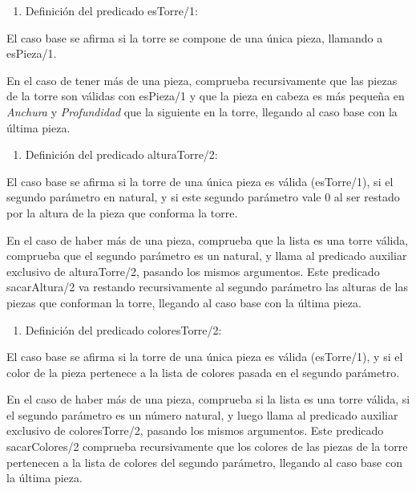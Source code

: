 \documentclass{article} %
\begin{document}
\noindent 

\begin{enumerate}
\item  Definición del predicado esTorre/1:
\end{enumerate}

\noindent El caso base se afirma si la torre se compone de una única pieza, llamando a esPieza/1.

\noindent En el caso de tener más de una pieza, comprueba recursivamente que las piezas de la torre son válidas con esPieza/1 y que la pieza en cabeza es más pequeña en \textit{Anchura} y \textit{Profundidad} que la siguiente en la torre, llegando al caso base con la última pieza.

\noindent 

\begin{enumerate}
\item  Definición del predicado alturaTorre/2:
\end{enumerate}

\noindent El caso base se afirma si la torre de una única pieza es válida (esTorre/1), si el segundo parámetro en natural, y si este segundo parámetro vale 0 al ser restado por la altura de la pieza que conforma la torre.

\noindent En el caso de haber más de una pieza, comprueba que la lista es una torre válida, comprueba que el segundo parámetro es un natural, y llama al predicado auxiliar exclusivo de alturaTorre/2, pasando los mismos argumentos. Este predicado sacarAltura/2 va restando recursivamente al segundo parámetro las alturas de las piezas que conforman la torre, llegando al caso base con la última pieza.

\noindent 

\begin{enumerate}
\item  Definición del predicado coloresTorre/2:
\end{enumerate}

\noindent El caso base se afirma si la torre de una única pieza es válida (esTorre/1), y si el color de la pieza pertenece a la lista de colores pasada en el segundo parámetro.

\noindent En el caso de haber más de una pieza, comprueba si la lista es una torre válida, si el segundo parámetro es un número natural, y luego llama al predicado auxiliar exclusivo de coloresTorre/2, pasando los mismos argumentos. Este predicado sacarColores/2 comprueba recursivamente que los colores de las piezas de la torre pertenecen a la lista de colores del segundo parámetro, llegando al caso base con la última pieza.
\end{document}
